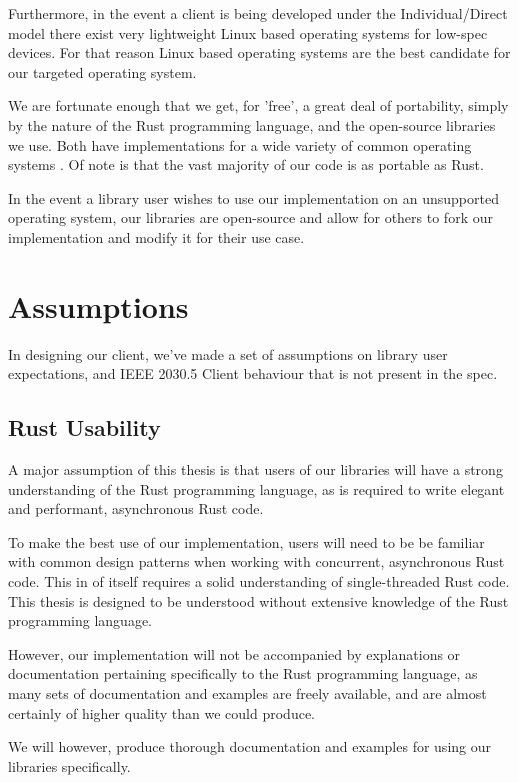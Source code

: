 Furthermore, in the event a client is being developed under the Individual/Direct model there exist very lightweight Linux based operating systems for low-spec devices. For that reason Linux based operating systems are the best candidate for our targeted operating system.

We are fortunate enough that we get, for 'free', a great deal of portability, simply by the nature of the Rust programming language, and the open-source libraries we use. Both have implementations for a wide variety of common operating systems \cite{RustPlatforms} \cite{TokioDocs}. Of note is that the vast majority of our code is as portable as Rust.

In the event a library user wishes to use our implementation on an unsupported operating system, our libraries are open-source and allow for others to fork our implementation and modify it for their use case.
    
\section{Assumptions}
In designing our client, we've made a set of assumptions on library user expectations, and IEEE 2030.5 Client behaviour that is not present in the spec.

\subsection{Rust Usability}
A major assumption of this thesis is that users of our libraries will have a strong understanding of the Rust programming language, as is required to write elegant and performant, asynchronous Rust code.

To make the best use of our implementation, users will need to be be familiar with common design patterns when working with concurrent, asynchronous Rust code. This in of itself requires a solid understanding of single-threaded Rust code. This thesis is designed to be understood without extensive knowledge of the Rust programming language.

However, our implementation will not be accompanied by explanations or documentation pertaining specifically to the Rust programming language, as many sets of documentation and examples are freely available, and are almost certainly  of higher quality than we could produce. 

We will however, produce thorough documentation and examples for using our libraries specifically.

